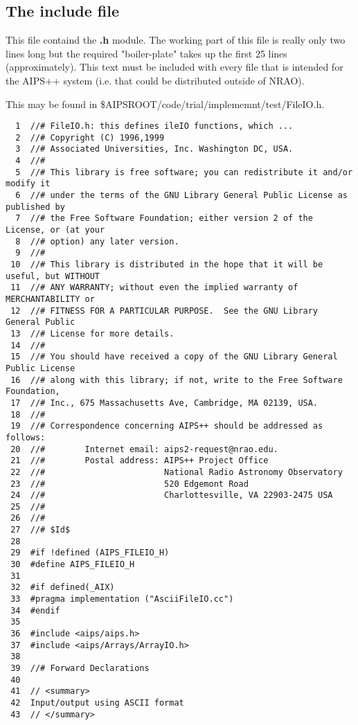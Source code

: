 \newpage
\subsection{The {\bf include} file}

	This file containd the {\bf .h} module. 	The working part of
this file is really only two lines long but the required
"boiler-plate" takes up the first 25 lines (approximately). This text
must be included with every file that is intended for the AIPS++
system (i.e. that could be distributed outside of NRAO).  



\newpage

This 
may be found in \$AIPSROOT/code/trial/implememnt/test/FileIO.h.
\begin{verbatim}
  1  //# FileIO.h: this defines ileIO functions, which ...
  2  //# Copyright (C) 1996,1999
  3  //# Associated Universities, Inc. Washington DC, USA.
  4  //#
  5  //# This library is free software; you can redistribute it and/or modify it
  6  //# under the terms of the GNU Library General Public License as published by
  7  //# the Free Software Foundation; either version 2 of the License, or (at your
  8  //# option) any later version.
  9  //#
 10  //# This library is distributed in the hope that it will be useful, but WITHOUT
 11  //# ANY WARRANTY; without even the implied warranty of MERCHANTABILITY or
 12  //# FITNESS FOR A PARTICULAR PURPOSE.  See the GNU Library General Public
 13  //# License for more details.
 14  //#
 15  //# You should have received a copy of the GNU Library General Public License
 16  //# along with this library; if not, write to the Free Software Foundation,
 17  //# Inc., 675 Massachusetts Ave, Cambridge, MA 02139, USA.
 18  //#
 19  //# Correspondence concerning AIPS++ should be addressed as follows:
 20  //#        Internet email: aips2-request@nrao.edu.
 21  //#        Postal address: AIPS++ Project Office
 22  //#                        National Radio Astronomy Observatory
 23  //#                        520 Edgemont Road
 24  //#                        Charlottesville, VA 22903-2475 USA
 25  //#
 26  //#
 27  //# $Id$
 28
 29  #if !defined (AIPS_FILEIO_H)
 30  #define AIPS_FILEIO_H
 31
 32  #if defined(_AIX)
 33  #pragma implementation ("AsciiFileIO.cc")
 34  #endif
 35
 36  #include <aips/aips.h>
 37  #include <aips/Arrays/ArrayIO.h>
 38
 39  //# Forward Declarations
 40
 41  // <summary>
 42  Input/output using ASCII format
 43  // </summary>

\end{verbatim}
